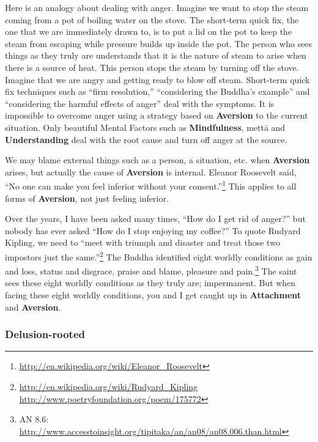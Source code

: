 Here is an analogy about dealing with anger. Imagine we want to stop the steam coming from a pot of boiling water on the stove. The short-term quick fix, the one that we are immediately drawn to, is to put a lid on the pot to keep the steam from escaping while pressure builds up inside the pot. The person who sees things as they truly are understands that it is the nature of steam to arise when there is a source of heat. This person stops the steam by turning off the stove. Imagine that we are angry and getting ready to blow off steam. Short-term quick fix techniques such as “firm resolution,” “considering the Buddha’s example” and “considering the harmful effects of anger” deal with the symptoms. It is impossible to overcome anger using a strategy based on \textbf{Aversion} to the current situation. Only beautiful Mental Factors such as \textbf{Mindfulness}, mettā and \textbf{Understanding} deal with the root cause and turn off anger at the source.

We may blame external things such as a person, a situation, etc. when \textbf{Aversion} arises, but actually the cause of \textbf{Aversion} is internal. Eleanor Roosevelt said, “No one can make you feel inferior without your consent.”\footnote{\url{http://en.wikipedia.org/wiki/Eleanor_Roosevelt}} This applies to all forms of \textbf{Aversion}, not just feeling inferior.

Over the years, I have been asked many times, “How do I get rid of anger?” but nobody has ever asked “How do I stop enjoying my coffee?” To quote Rudyard Kipling, we need to “meet with triumph and disaster and treat those two impostors just the same.”\footnote{\url{http://en.wikipedia.org/wiki/Rudyard_Kipling} \newline \url{http://www.poetryfoundation.org/poem/175772}} The Buddha identified eight worldly conditions as gain and loss, status and disgrace, praise and blame, pleasure and pain.\footnote{AN 8.6: \url{http://www.accesstoinsight.org/tipitaka/an/an08/an08.006.than.html}} The saint sees these eight worldly conditions as they truly are; impermanent. But when facing these eight worldly conditions, you and I get caught up in \textbf{Attachment} and \textbf{Aversion}.

\subsubsection*{Delusion-rooted}

